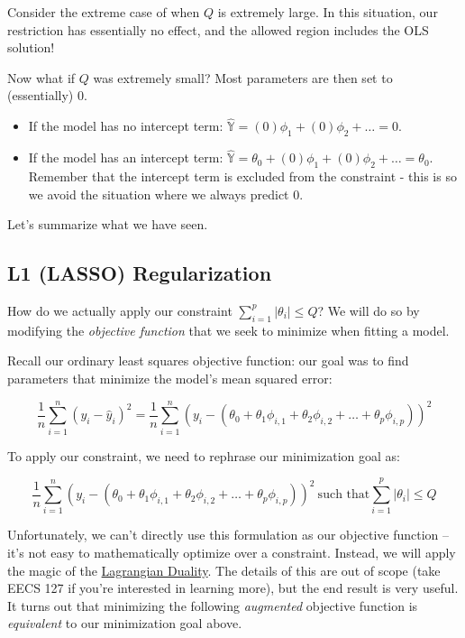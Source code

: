 \documentclass[
  letterpaper,
  DIV=11,
  numbers=noendperiod]{scrreprt}
\providecommand{\tightlist}{%
  \setlength{\itemsep}{0pt}\setlength{\parskip}{0pt}}\usepackage{longtable,booktabs,array}
\begin{document}
Consider the extreme case of when \(Q\) is extremely large. In this
situation, our restriction has essentially no effect, and the allowed
region includes the OLS solution!

Now what if \(Q\) was extremely small? Most parameters are then set to
(essentially) 0.

\begin{itemize}
\tightlist
\item
  If the model has no intercept term:
  \(\hat{\mathbb{Y}} = (0)\phi_1 + (0)\phi_2 + \ldots = 0\).
\item
  If the model has an intercept term:
  \(\hat{\mathbb{Y}} = \theta_0 + (0)\phi_1 + (0)\phi_2 + \ldots = \theta_0\).
  Remember that the intercept term is excluded from the constraint -
  this is so we avoid the situation where we always predict 0.
\end{itemize}

Let's summarize what we have seen.

\subsection{L1 (LASSO) Regularization}\label{l1-lasso-regularization}

How do we actually apply our constraint
\(\sum_{i=1}^p |\theta_i| \leq Q\)? We will do so by modifying the
\emph{objective function} that we seek to minimize when fitting a model.

Recall our ordinary least squares objective function: our goal was to
find parameters that minimize the model's mean squared error:

\[\frac{1}{n} \sum_{i=1}^n (y_i - \hat{y}_i)^2 = \frac{1}{n} \sum_{i=1}^n (y_i - (\theta_0 + \theta_1 \phi_{i, 1} + \theta_2 \phi_{i, 2} + \ldots + \theta_p \phi_{i, p}))^2\]

To apply our constraint, we need to rephrase our minimization goal as:

\[\frac{1}{n} \sum_{i=1}^n (y_i - (\theta_0 + \theta_1 \phi_{i, 1} + \theta_2 \phi_{i, 2} + \ldots + \theta_p \phi_{i, p}))^2\:\text{such that} \sum_{i=1}^p |\theta_i| \leq Q\]

Unfortunately, we can't directly use this formulation as our objective
function -- it's not easy to mathematically optimize over a constraint.
Instead, we will apply the magic of the
\href{https://en.wikipedia.org/wiki/Duality_(optimization)}{Lagrangian
Duality}. The details of this are out of scope (take EECS 127 if you're
interested in learning more), but the end result is very useful. It
turns out that minimizing the following \emph{augmented} objective
function is \emph{equivalent} to our minimization goal above.
\end{document}
